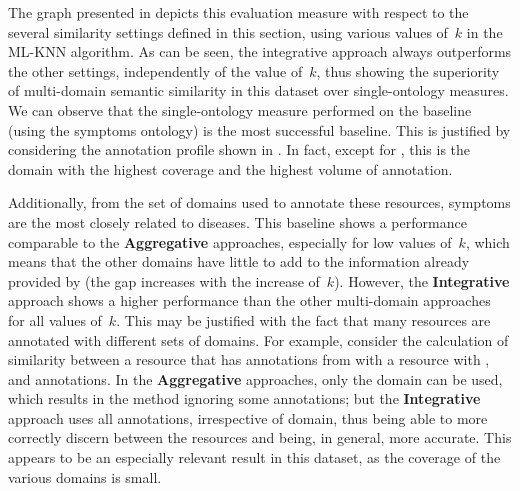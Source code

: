 The graph presented in  depicts this evaluation measure with respect to the several similarity settings defined in this section, using various values of~$k$ in the ML-KNN algorithm. As can be seen, the integrative approach always outperforms the other settings, independently of the value of~$k$, thus showing the superiority of multi-domain semantic similarity in this dataset over single-ontology measures. We can observe that the single-ontology measure performed on the  baseline (using the symptoms ontology) is the most successful baseline. This is justified by considering the annotation profile shown in . In fact, except for , this is the domain with the highest coverage and the highest volume of annotation.

Additionally, from the set of domains used to annotate these resources, symptoms are the most closely related to diseases. This baseline shows a performance comparable to the \textbf{Aggregative} approaches, especially for low values of~$k$, which means that the other domains have little to add to the information already provided by  (the gap increases with the increase of~$k$). However, the \textbf{Integrative} approach shows a higher performance than the other multi-domain approaches for all values of~$k$. This may be justified with the fact that many resources are annotated with different sets of domains. For example, consider the calculation of similarity between a resource that has annotations from  with a resource with ,  and  annotations. In the \textbf{Aggregative} approaches, only the  domain can be used, which results in the method ignoring some annotations; but the \textbf{Integrative} approach uses all annotations, irrespective of domain, thus being able to more correctly discern between the resources and being, in general, more accurate. This appears to be an especially relevant result in this dataset, as the coverage of the various domains is small.


